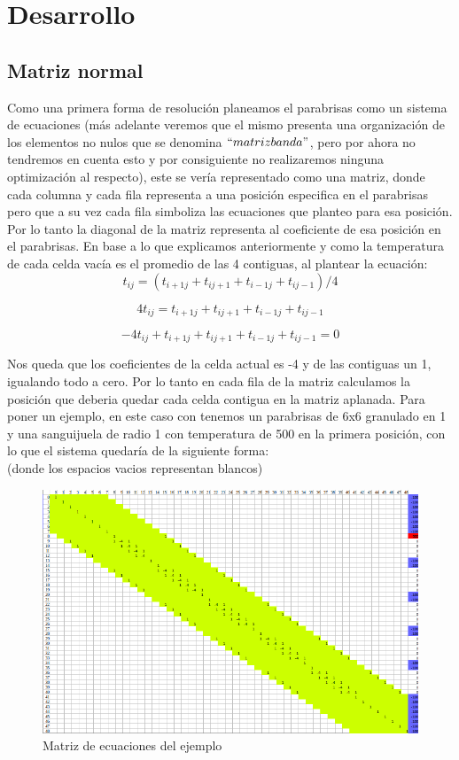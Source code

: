 \section{Desarrollo}

\subsection{Matriz normal}

Como una primera forma de resolución planeamos el parabrisas como un sistema de ecuaciones (más adelante veremos que el mismo presenta una organización de los elementos no nulos que se denomina $``matriz banda"$, pero por ahora no tendremos en cuenta esto y por consiguiente no realizaremos ninguna optimización al respecto), este se vería representado como una matriz, donde cada columna y cada fila representa a una posición especifica en el parabrisas pero que a su vez cada fila simboliza las ecuaciones que planteo para esa posición. Por lo tanto la diagonal de la matriz representa al coeficiente de esa posición en el parabrisas.
En base a lo que explicamos anteriormente y como la temperatura de cada celda vacía es el promedio de las 4 contiguas, al plantear la ecuación: 
\[
t_{ij} = (t_{i+1 j} + t_{i j+1} + t_{i-1 j} + t_{i j-1}) / 4
\]

\[
4 t_{ij} = t_{i+1 j} + t_{i j+1} + t_{i-1 j} + t_{i j-1}
\]

\[
 - 4 t_{ij} + t_{i+1 j} + t_{i j+1} + t_{i-1 j} + t_{i j-1}  = 0
\]

Nos queda que los coeficientes de la celda actual es -4 y de las contiguas un 1, igualando todo a cero.
Por lo tanto en cada fila de la matriz calculamos la posición que deberia quedar cada celda contigua en la matriz aplanada.
Para poner un ejemplo, en este caso con tenemos un parabrisas de 6x6 granulado en 1 y una sanguijuela de radio 1 con temperatura de 500 en la primera posición, con lo que el sistema quedaría de la siguiente forma: \\
(donde los espacios vacios representan blancos)
\begin{figure}
\begin{center}
\includegraphics[scale=0.60]{imagenes/matrizej.png} 
\caption{Matriz de ecuaciones del ejemplo} 
\end{center}
\end{figure}


